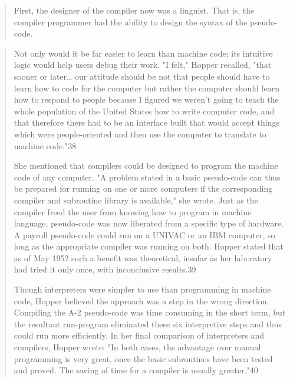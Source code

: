 \begin{quotation}
First, the designer of the compiler now was a linguist. That is,
the compiler programmer had the ability to design the syntax of
the pseudo-code.
\end{quotation}
\begin{quotation}
Not only would it be far easier to learn
than machine code; its intuitive logic would help users debug
their work. "I felt," Hopper recalled, "that sooner or later\dots
our attitude should be not that people should have to learn how
to code for the computer but rather the computer should learn
how to respond to people because I figured we weren't going to
teach the whole population of the United States how to write
computer code, and that therefore there had to be an interface
built that would accept things which were people-oriented and
then use the computer to translate to machine code."38

She mentioned that compilers
could be designed to program the machine code of any computer. "A problem stated in a basic pseudo-code can thus be
prepared for running on one or more computers if the corresponding compiler and subroutine library is available," she wrote.
Just as the compiler freed the user from knowing how to program
in machine language, pseudo-code was now liberated from a
specific type of hardware. A payroll pseudo-code could run on
a UNIVAC or an IBM computer, so long as the appropriate
compiler was running on both. Hopper stated that as of May
1952 such a benefit was theoretical, insofar as her laboratory had
tried it only once, with inconclusive results.39

Though interpreters were simpler to use than programming in machine code, 
Hopper believed the approach was a step in the wrong direction. Compiling the 
A-2 pseudo-code was time consuming in the short term, but the resultant 
run-program eliminated these six interpretive steps and thus could run more 
efficiently. In her final comparison of interpreters and compilers, Hopper 
wrote: "In both cases, the advantage over manual programming is very great, 
once the basic subroutines have been tested and proved. The saving of time for 
a compiler is usually greater."40
\end{quotation}

